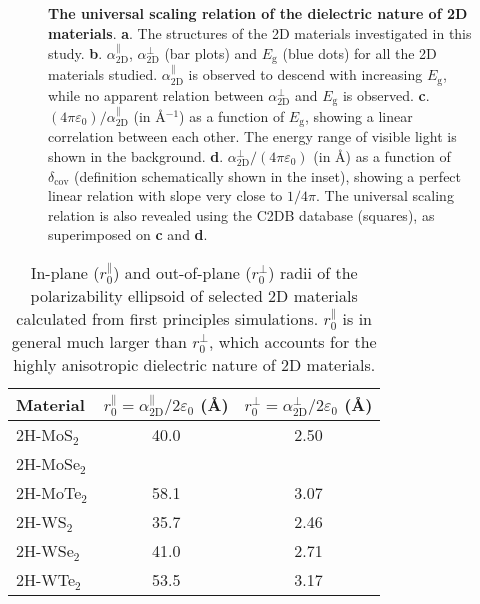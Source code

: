 \documentclass[journal=ancac3,manuscript=article,email=true,hyperref=true,keywords=false]{achemso}
\begin{document}
\begin{figure}[H]
\centering
\caption{\label{fig-3} \textbf{The universal scaling relation of the
    dielectric nature of 2D
    materials}. \textbf{a}. The structures of the 2D materials investigated in this study. \textbf{b}. $\alpha_{\mathrm{2D}}^{\parallel}$, $\alpha_{\mathrm{2D}}^{\perp}$
  (bar plots) and $E_{\mathrm{g}}$ (blue dots) for all the 2D
  materials studied.  $\alpha_{\mathrm{2D}}^{\parallel}$ is observed to descend with
  increasing $E_{\mathrm{g}}$, while no apparent relation between
  $\alpha_{\mathrm{2D}}^{\perp}$ and $E_{\mathrm{g}}$ is
  observed. \textbf{c}. $(4\pi \varepsilon_{0})/\alpha_{\mathrm{2D}}^{\parallel}$
  (in \AA{}$^{-1}$) as a function of $E_{\mathrm{g}}$, showing a linear
  correlation between each other. The energy range of visible light is
  shown in the
  background. \textbf{d}. $\alpha_{\mathrm{2D}}^{\perp}/(4\pi\varepsilon_{0})$ (in
  \AA{}) as a function of $\delta_{\mathrm{cov}}$ (definition
  schematically shown in the inset), showing a perfect linear relation
  with slope very close to $1/4\pi$. The universal scaling relation is
  also revealed using the C2DB database (squares), as superimposed on \textbf{c}
  and \textbf{d}.}
\end{figure}


\begin{table}[H]
  \centering
  \caption{In-plane ($r_{0}^{\parallel}$) and out-of-plane
    ($r_{0}^{\perp}$) radii of the polarizability ellipsoid of
    selected 2D materials calculated from first principles
    simulations. $r_{0}^{\parallel}$ is in general much larger than
    $r_{0}^{\perp}$, which accounts for the highly anisotropic
    dielectric nature of 2D materials.}
  \label{tbl:radii}  
  \begin{tabular}{lcc}
    \hline
    Material & $r_{0}^{\parallel} = \alpha_{\mathrm{2D}}^{\parallel}/2\varepsilon_{0}$ (\AA{}) &  $r_{0}^{\perp} = \alpha_{\mathrm{2D}}^{\perp}/2\varepsilon_{0}$ (\AA{})\\
    \hline
    2H-MoS$_{2}$ & 40.0 & 2.50 \\
    2H-MoSe$_{2}$ & &  \\
    2H-MoTe$_{2}$ & 58.1 & 3.07  \\
    2H-WS$_{2}$ & 35.7 & 2.46  \\
    2H-WSe$_{2}$ & 41.0 & 2.71 \\
    2H-WTe$_{2}$ & 53.5 &  3.17\\
    \hline
  \end{tabular}
\end{table}
\end{document}
